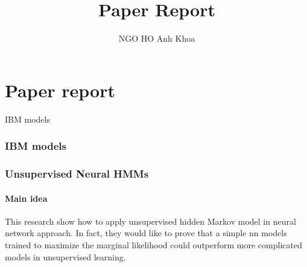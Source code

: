 \documentclass{article}
\title{Paper Report}
\author{NGO HO Anh Khoa}
\begin{document}
\maketitle

\tableofcontents
\newpage



\part{Paper report}

IBM models


\section{IBM models}


\section{Unsupervised Neural HMMs \citep{Tran16unsupervised}}
\subsection{Main idea}
This research show how to apply unsupervised hidden Markov model in neural network approach. In fact, they would like to prove that a simple nn models trained to maximize the marginal likelihood could outperform more complicated models in unsupervised learning.
\end{document}
